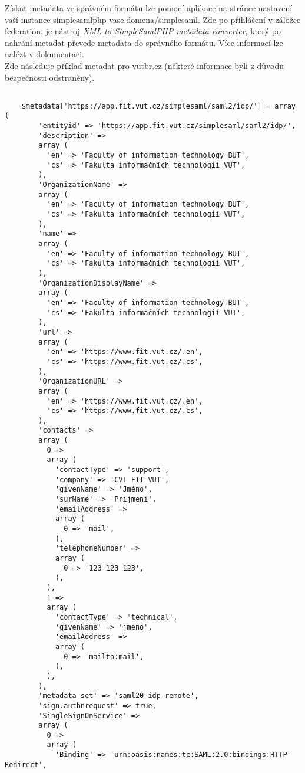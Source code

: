 Získat metadata ve správném formátu lze pomocí aplikace na stránce nastavení vaší instance simplesamlphp vase.domena/simplesaml.
Zde po přihlášení v záložce federation, je nástroj \emph{XML to SimpleSamlPHP metadata converter}, který po nahrání metadat převede metadata do správného formátu.
Více informací lze nalézt v dokumentaci.\cite{SimpleSAMLphp-Service-Provider-QuickStart}
\\
Zde následuje příklad metadat pro vutbr.cz (některé informace byli z důvodu bezpečnosti odstraněny).
\begin{lstlisting}

    $metadata['https://app.fit.vut.cz/simplesaml/saml2/idp/'] = array (
        'entityid' => 'https://app.fit.vut.cz/simplesaml/saml2/idp/',
        'description' =>
        array (
          'en' => 'Faculty of information technology BUT',
          'cs' => 'Fakulta informačních technologií VUT',
        ),
        'OrganizationName' =>
        array (
          'en' => 'Faculty of information technology BUT',
          'cs' => 'Fakulta informačních technologií VUT',
        ),
        'name' =>
        array (
          'en' => 'Faculty of information technology BUT',
          'cs' => 'Fakulta informačních technologií VUT',
        ),
        'OrganizationDisplayName' =>
        array (
          'en' => 'Faculty of information technology BUT',
          'cs' => 'Fakulta informačních technologií VUT',
        ),
        'url' =>
        array (
          'en' => 'https://www.fit.vut.cz/.en',
          'cs' => 'https://www.fit.vut.cz/.cs',
        ),
        'OrganizationURL' =>
        array (
          'en' => 'https://www.fit.vut.cz/.en',
          'cs' => 'https://www.fit.vut.cz/.cs',
        ),
        'contacts' =>
        array (
          0 =>
          array (
            'contactType' => 'support',
            'company' => 'CVT FIT VUT',
            'givenName' => 'Jméno',
            'surName' => 'Prijmeni',
            'emailAddress' =>
            array (
              0 => 'mail',
            ),
            'telephoneNumber' =>
            array (
              0 => '123 123 123',
            ),
          ),
          1 =>
          array (
            'contactType' => 'technical',
            'givenName' => 'jmeno',
            'emailAddress' =>
            array (
              0 => 'mailto:mail',
            ),
          ),
        ),
        'metadata-set' => 'saml20-idp-remote',
        'sign.authnrequest' => true,
        'SingleSignOnService' =>
        array (
          0 =>
          array (
            'Binding' => 'urn:oasis:names:tc:SAML:2.0:bindings:HTTP-Redirect',

\end{lstlisting}
